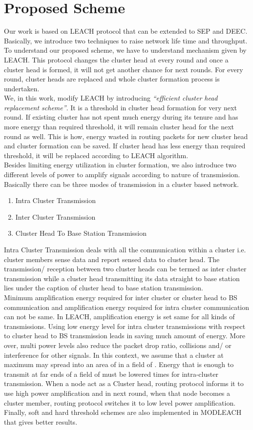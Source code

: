 \documentclass[10pt, conference, compsocconf]{IEEEtran}
\begin{document}
\section{Proposed Scheme}
Our work is based on LEACH protocol that can be extended to SEP and DEEC. Basically, we introduce two techniques to raise network life time and throughput. To understand our proposed scheme, we have to understand mechanism given by LEACH. This protocol changes the cluster head at every round and once a cluster head is formed, it will not get another chance for next  rounds. For every round, cluster heads are replaced and whole cluster formation process is undertaken. \\
We, in this work, modify LEACH by introducing \emph{``efficient cluster head replacement scheme''}. It is a threshold in cluster head formation for very next round. If existing cluster has not spent much energy during its tenure and has more energy than required threshold, it will remain cluster head for the next round as well. This is how, energy wasted in routing packets for new cluster head and cluster formation can be saved. If cluster head has less energy than required threshold, it will be replaced according to LEACH algorithm.\\
Besides limiting energy utilization in cluster formation, we also introduce two different levels of power to amplify signals according to nature of transmission. Basically there can be three modes of transmission in a cluster based network.
\begin{enumerate}
  \item {Intra Cluster Transmission}
  \item {Inter Cluster Transmission}
  \item {Cluster Head To Base Station Transmission}
\end{enumerate}
Intra Cluster Transmission deals with all the communication within a cluster i.e. cluster members sense data and report sensed data to cluster head. The transmission/ reception between two cluster heads can be termed as inter cluster transmission while a cluster head transmitting its data straight to base station lies under the caption of cluster head to base station transmission.\\
Minimum amplification energy required for inter cluster or cluster head to BS communication and amplification energy required for intra cluster communication can not be same. In LEACH, amplification energy is set same for all kinds of transmissions. Using low energy level for intra cluster transmissions with respect to cluster head to BS transmission leads in saving much amount of energy. More over, multi power levels also reduce the packet drop ratio, collisions and/ or interference for other signals. In this context, we assume that a cluster at maximum may spread into an area of  in a field of . Energy that is enough to transmit at far ends of a field of  must be lowered  times for intra-cluster transmission. When a node act as a Cluster head, routing protocol informs it to use high power amplification and in next round, when that node becomes a cluster member, routing protocol switches it to low level power amplification. Finally, soft and hard threshold schemes are also implemented in MODLEACH that gives better results.
\end{document}

